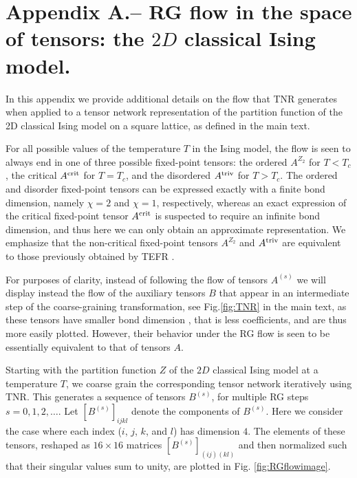 \documentclass[aps,prl,twocolumn,showpacs,superscriptaddress,floatfix,10pt]{revtex4-1}
\def\TRI{\mbox{\scriptsize triv}}
\def\CRI{\mbox{\scriptsize crit}}
\begin{document}
\newpage
\appendix
\section{Appendix A.-- RG flow in the space of tensors: the $2D$ classical Ising model.} 

In this appendix we provide additional details on the flow that TNR generates when applied to a tensor network representation of the partition function of the 2D classical Ising model on a square lattice, as defined in the main text.

For all possible values of the temperature $T$ in the Ising model, the flow is seen to always end in one of three possible fixed-point tensors: the ordered $A^{Z_2}$ for $T<T_c$, the critical $A^{\CRI}$ for $T=T_c$, and the disordered $A^{\TRI}$ for $T>T_c$. The ordered and disorder fixed-point tensors can be expressed exactly with a finite bond dimension, namely $\chi=2$ and $\chi=1$, respectively, whereas an exact expression of the critical fixed-point tensor $A^{\CRI}$ is suspected to require an infinite bond dimension, and thus here we can only obtain an approximate representation. We emphasize that the non-critical fixed-point tensors $A^{Z_2}$ and $A^{\TRI}$ are equivalent to those previously obtained by TEFR \cite{TEFR}.

For purposes of clarity, instead of following the flow of tensors $A^{(s)}$ we will display instead the flow of the auxiliary tensors $B$ that appear in an intermediate step of the coarse-graining transformation, see Fig.\ref{fig:TNR} in the main text, as these tensors have smaller bond dimension \cite{chiexplain}, that is less coefficients, and are thus more easily plotted. However, their behavior under the RG flow is seen to be essentially equivalent to that of tensors $A$.

Starting with the partition function $Z$ of the $2D$ classical Ising model at a temperature $T$, we coarse grain the corresponding tensor network iteratively using TNR. This generates a sequence of tensors $B^{(s)}$, for multiple RG steps $s=0,1,2,\ldots$. Let $[B^{(s)}]_{ijkl}$ denote the components of $B^{(s)}$. Here we consider the case where each index ($i$, $j$, $k$, and $l$) has dimension $4$.  The elements of these tensors, reshaped as $16\times 16$ matrices $[B^{(s)}]_{(ij)(kl)}$ and then normalized such that their singular values sum to unity, are plotted in Fig. \ref{fig:RGflowimage}.
\end{document}
